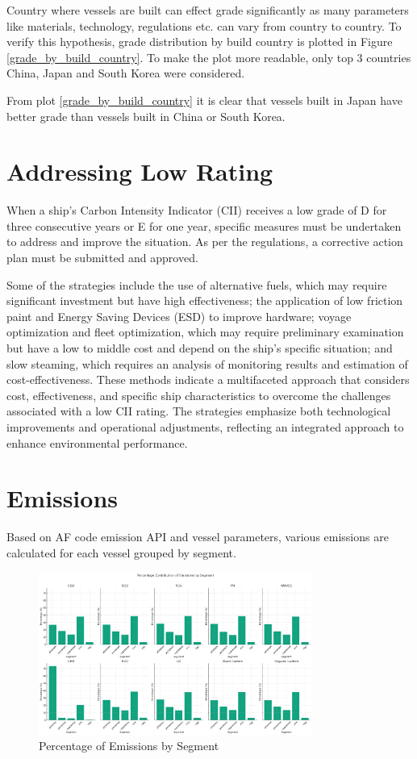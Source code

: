 Country where vessels are built can effect grade significantly as many parameters like materials, technology, regulations etc. can vary from country to country.
To verify this hypothesis, grade distribution by build country is plotted in Figure \ref{grade_by_build_country}.
To make the plot more readable, only top 3 countries China, Japan and South Korea were considered.

From plot \ref{grade_by_build_country} it is clear that vessels built in Japan have better grade than vessels built in China or South Korea.

\section{Addressing Low Rating}

When a ship's Carbon Intensity Indicator (CII) receives a low grade of D for three consecutive years or E for one year, specific measures must be undertaken to address and improve the situation. 
As per the regulations, a corrective action plan must be submitted and approved. 

Some of the strategies include the use of alternative fuels, which may require significant investment but have high effectiveness; 
the application of low friction paint and Energy Saving Devices (ESD) to improve hardware; 
voyage optimization and fleet optimization, which may require preliminary examination but have a low to middle cost and depend on the ship's specific situation; 
and slow steaming, which requires an analysis of monitoring results and estimation of cost-effectiveness. 
These methods indicate a multifaceted approach that considers cost, effectiveness, and specific ship characteristics to overcome the challenges associated with a low CII rating. 
The strategies emphasize both technological improvements and operational adjustments, reflecting an integrated approach to enhance environmental performance.


\section{Emissions}

Based on AF code emission API and vessel parameters, various emissions are calculated for each vessel grouped by segment.

\begin{figure}[h]
    \centering
    \includegraphics[width=0.8\textwidth]{images/segment_emissions.png}
    \caption{Percentage of Emissions by Segment}
    \label{segment_emissions}
\end{figure}

